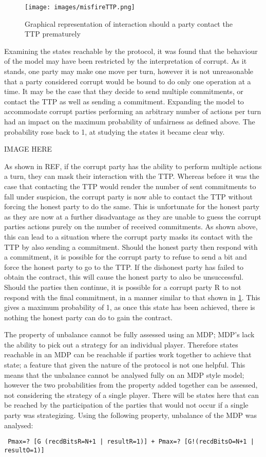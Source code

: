 \documentclass{l4proj}
\begin{document}
\begin{figure}[ht!]
\centering
\texttt{[image: images/misfireTTP.png]}
\caption{Graphical representation of interaction should a party contact the TTP prematurely}
\label{misfireTTP}
\end{figure}

Examining the states reachable by the protocol, it was found that the behaviour of the model may have been restricted by the interpretation of corrupt. As it stands, one party may make one move per turn, however it is not unreasonable that a party considered corrupt would be bound to do only one operation at a time. It may be the case that they decide to send multiple commitments, or contact the TTP as well as sending a commitment. Expanding the model to accommodate corrupt parties performing an arbitrary number of actions per turn had an impact on the maximum probability of unfairness as defined above. The probability rose back to 1, at studying the states it became clear why.

IMAGE HERE

As shown in REF, if the corrupt party has the ability to perform multiple actions a turn, they can mask their interaction with the TTP. Whereas before it was the case that contacting the TTP would render the number of sent commitments to fall under suspicion, the corrupt party is now able to contact the TTP without forcing the honest party to do the same. This is unfortunate for the honest party as they are now at a further disadvantage as they are unable to guess the corrupt parties actions purely on the number of received commitments. As shown above, this can lead to a situation where the corrupt party masks its contact with the TTP by also sending a commitment. Should the honest party then respond with a commitment, it is possible for the corrupt party to refuse to send a bit and force the honest party to go to the TTP. If the dishonest party has failed to obtain the contract, this will cause the honest party to also be unsuccessful. Should the parties then continue, it is possible for a corrupt party R to not respond with the final commitment, in a manner similar to that shown in \ref{misfireTTP}. This gives a maximum probability of 1, as once this state has been achieved, there is nothing the honest party can do to gain the contract. 

The property of unbalance cannot be fully assessed using an MDP; MDP's lack the ability to pick out a strategy for an individual player. Therefore states reachable in an MDP can be reachable if parties work together to achieve that state; a feature that given the nature of the protocol is not one helpful. This means that the unbalance cannot be analysed fully on an MDP style model; however the two probabilities from the property added together can be assessed, not considering the strategy of a single player. There will be states here that can be reached by the participation of the parties that would not occur if a single party was strategizing. Using the following property, unbalance of the MDP was analysed:
\begin{lstlisting}
 Pmax=? [G (recdBitsR=N+1 | resultR=1)] + Pmax=? [G!(recdBitsO=N+1 | resultO=1)]
\end{lstlisting}
\end{document}
